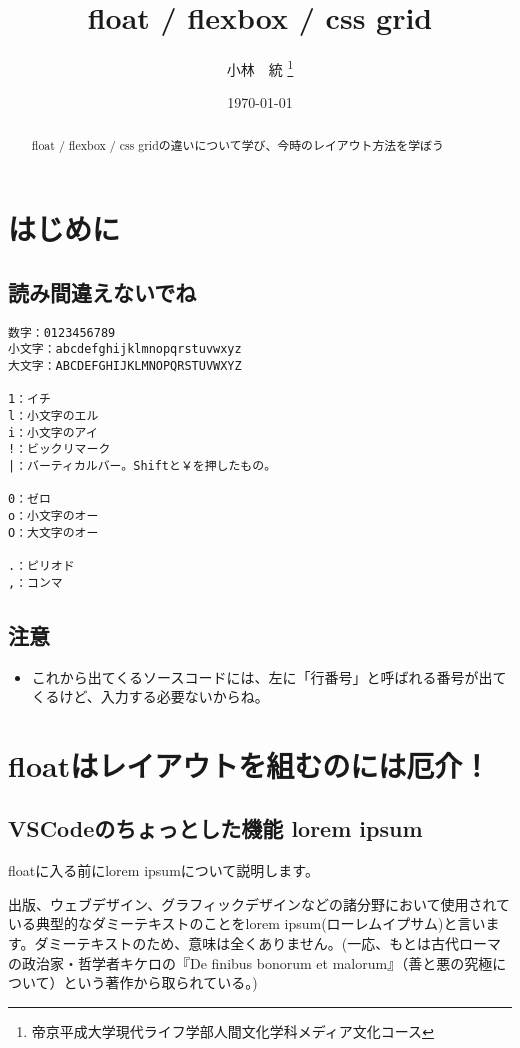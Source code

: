 \documentclass[mingoth,11pt,a4j,uplatex]{jsarticle}
\title{float / flexbox / css grid}
\author{小林　統 \thanks{帝京平成大学現代ライフ学部人間文化学科メディア文化コース}}
\date{\today}
\begin{document}

\maketitle

\begin{abstract}
float / flexbox / css gridの違いについて学び、今時のレイアウト方法を学ぼう
\end{abstract}

\tableofcontents
\newpage

\section{はじめに}
\subsection{読み間違えないでね}

\begin{lstlisting}[caption=読み間違えないでね]
数字：0123456789
小文字：abcdefghijklmnopqrstuvwxyz
大文字：ABCDEFGHIJKLMNOPQRSTUVWXYZ

1：イチ
l：小文字のエル
i：小文字のアイ
!：ビックリマーク
|：バーティカルバー。Shiftと￥を押したもの。

0：ゼロ
o：小文字のオー
O：大文字のオー

.：ピリオド
,：コンマ
\end{lstlisting}

\subsection{注意}
\begin{itemize}
\item これから出てくるソースコードには、左に「行番号」と呼ばれる番号が出てくるけど、入力する必要ないからね。
\end{itemize}

\section{floatはレイアウトを組むのには厄介！}
\subsection{VSCodeのちょっとした機能 lorem ipsum}
floatに入る前にlorem ipsumについて説明します。

出版、ウェブデザイン、グラフィックデザインなどの諸分野において使用されている典型的なダミーテキストのことをlorem ipsum(ローレムイプサム)と言います。ダミーテキストのため、意味は全くありません。(一応、もとは古代ローマの政治家・哲学者キケロの『De finibus bonorum et malorum』（善と悪の究極について）という著作から取られている。)
\end{document}
